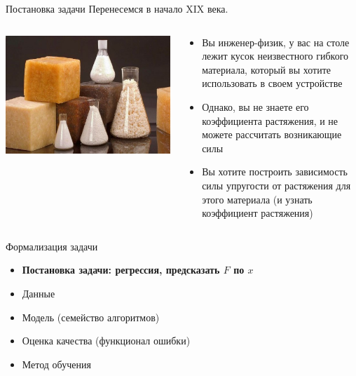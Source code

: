 \documentclass[aspectratio=169]{beamer}
\begin{document}
\begin{frame}{Постановка задачи}
    Перенесемся в начало XIX века.
    \vfill
    \begin{columns}
        \begin{column}{.4\linewidth}
            \includegraphics[width=\linewidth]{figures/fig2.jpg}
        \end{column}
        \begin{column}{.6\linewidth}
            \small
            \begin{itemize}
                \item Вы инженер-физик, у вас на столе лежит кусок неизвестного гибкого материала,
                который вы хотите использовать в своем устройстве
                \item Однако, вы не знаете его коэффициента растяжения, и не можете рассчитать
                возникающие силы
                \item Вы хотите построить зависимость силы упругости от растяжения для этого
                материала (и узнать коэффициент растяжения)
            \end{itemize}
        \end{column}
    \end{columns}
\end{frame}

\begin{frame}{Формализация задачи}
    \begin{itemize}
        \item \textbf{Постановка задачи: регрессия, предсказать \( F \) по \( x \)}
        \item Данные
        \item Модель (семейство алгоритмов)
        \item Оценка качества (функционал ошибки)
        \item Метод обучения
    \end{itemize}
\end{frame}
\end{document}
